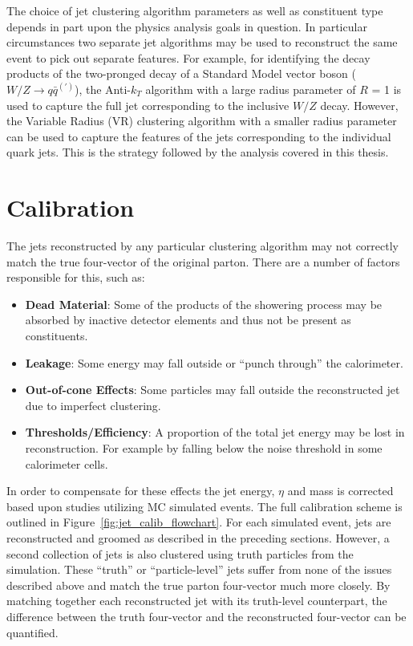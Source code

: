

The choice of jet clustering algorithm parameters as well as constituent type depends in part upon the physics analysis goals in question.
In particular circumstances two separate jet algorithms may be used to reconstruct the same event to pick out separate features.
For example, for identifying the decay products of the two-pronged decay of a Standard Model vector boson ($W/Z \rightarrow q\bar{q}^{(\prime)}$), the Anti-$k_T$ algorithm with a large radius parameter of $R$ = 1 is used to capture the full jet corresponding to the inclusive $W/Z$ decay.
However, the Variable Radius (VR) clustering algorithm with a smaller radius parameter can be used to capture the features of the jets corresponding to the individual quark jets.
This is the strategy followed by the analysis covered in this thesis.

\section{Calibration}
The jets reconstructed by any particular clustering algorithm may not correctly match the true four-vector of the original parton.
There are a number of factors responsible for this, such as:
\begin{itemize}
    \itemsep0em 
    \item \textbf{Dead Material}: Some of the products of the showering process may be absorbed by inactive detector elements and thus not be present as constituents.
    \item \textbf{Leakage}: Some energy may fall outside or ``punch through'' the calorimeter.
    \item \textbf{Out-of-cone Effects}: Some particles may fall outside the reconstructed jet due to imperfect clustering.
    \item \textbf{Thresholds/Efficiency}: A proportion of the total jet energy may be lost in reconstruction. For example by falling below the noise threshold in some calorimeter cells.
\end{itemize}

In order to compensate for these effects the jet energy, $\eta$ and mass is corrected based upon studies utilizing MC simulated events.
The full calibration scheme is outlined in Figure~\ref{fig:jet_calib_flowchart}.
For each simulated event, jets are reconstructed and groomed as described in the preceding sections.
However, a second collection of jets is also clustered using truth particles from the simulation.
These ``truth'' or ``particle-level'' jets suffer from none of the issues described above and match the true parton four-vector much more closely.
By matching together each reconstructed jet with its truth-level counterpart, the difference between the truth four-vector and the reconstructed four-vector can be quantified.

